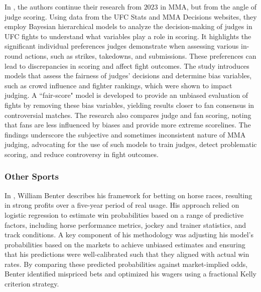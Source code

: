 \documentclass[12pt,twoside]{report}
\begin{document}
In \citep{holmes_2024}, the authors continue their research from $2023$ in MMA, but from the angle of judge scoring. Using data from the UFC Stats and MMA Decisions websites, they employ Bayesian hierarchical models to analyze the decision-making of judges in UFC fights to understand what variables play a role in scoring. It highlights the significant individual preferences judges demonstrate when assessing various in-round actions, such as strikes, takedowns, and submissions. These preferences can lead to discrepancies in scoring and affect fight outcomes. The study introduces models that assess the fairness of judges' decisions and determine bias variables, such as crowd influence and fighter rankings, which were shown to impact judging. A ``fair-score" model is developed to provide an unbiased evaluation of fights by removing these bias variables, yielding results closer to fan consensus in controversial matches. The research also compares judge and fan scoring, noting that fans are less influenced by biases and provide more extreme scorelines. The findings underscore the subjective and sometimes inconsistent nature of MMA judging, advocating for the use of such models to train judges, detect problematic scoring, and reduce controversy in fight outcomes.

\subsubsection{Other Sports}
In \citep{benter_2008}, William Benter describes his framework for betting on horse races, resulting in strong profits over a five-year period of real usage. His approach relied on logistic regression to estimate win probabilities based on a range of predictive factors, including horse performance metrics, jockey and trainer statistics, and track conditions. A key component of his methodology was adjusting his model's probabilities based on the markets to achieve unbiased estimates and ensuring that his predictions were well-calibrated such that they aligned with actual win rates. By comparing these predicted probabilities against market-implied odds, Benter identified mispriced bets and optimized his wagers using a fractional Kelly criterion strategy.
\end{document}
